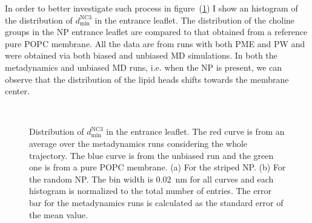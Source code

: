 In order to better investigate such process in figure~(\ref{fig:NC3minDist}) I show an histogram of the distribution of $d_\text{min}^{\text{NC}3}$ in the entrance leaflet. The distribution of the choline groups in the \ac{NP} entrance leaflet are compared to that obtained from a reference pure \ac{POPC} membrane. All the data are from runs with both \ac{PME} and \ac{PW} and were obtained via both biased and unbiased \ac{MD} simulations. In both the metadynamics and unbiased \ac{MD} runs, i.e. when the \ac{NP} is present, we can observe that the distribution of the lipid heads shifts towards the membrane center. 
\begin{figure}[th!]
	\center
	\\%
	\caption{Distribution of $d_\text{min}^{\text{NC}3}$ in the entrance leaflet. The red curve is from an average over the metadynamics runs considering the whole trajectory. The blue curve is from the unbiased run and the green one is from a pure \acs{POPC} membrane. (a) For the striped \acs{NP}. (b) For the random \acs{NP}. The bin width is $0.02$~nm for all curves and each histogram is normalized to the total number of entries. The error bar for the metadynamics runs is calculated as the standard error of the mean value.}%
	\label{fig:NC3minDist}
\end{figure}

